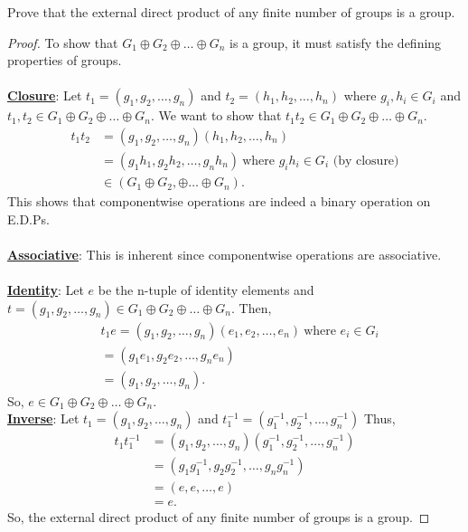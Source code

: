 \documentclass[12pt, letterpaper]{article}
\begin{document}
 Prove that the external direct product of any finite number of groups is a group.
\begin{proof}
    To show that $G_1 \oplus G_2 \oplus \ldots \oplus G_n$ is a group, it must satisfy the defining properties of groups. \\ \\
    \underline{\textbf{Closure}}: Let $t_{1} = (g_{1}, g_{2}, \ldots, g_n)$ and $t_{2} = (h_{1}, h_{2}, \ldots, h_{n})$ where $g_{i}, h_{i} \in G_{i}$ and $t_{1}, t_{2} \in G_1 \oplus G_2 \oplus \ldots \oplus G_n$. We want to show that $t_{1}t_{2} \in G_1 \oplus G_2 \oplus \ldots \oplus G_n$.
    \begin{align*}
        t_{1}t_{2} &=  (g_{1}, g_{2}, \ldots, g_n)(h_{1}, h_{2}, \ldots, h_{n}) \\
        &= (g_{1}h_{1}, g_{2}h_{2}, \ldots, g_{n}h_{n}) \ \text{where $g_ih_i \in G_i$ (by closure)} \\
        &\in (G_{1} \oplus G_{2}, \oplus \ldots \oplus G_{n}).
    \end{align*}
    This shows that componentwise operations are indeed a binary operation on E.D.Ps. \\ \\
    \underline{\textbf{Associative}}: This is inherent since componentwise operations are associative.  \\ \\
    \underline{\textbf{Identity}}: Let $e$ be the n-tuple of identity elements and $t = (g_{1}, g_{2}, \ldots, g_n) \in G_{1} \oplus G_{2} \oplus \ldots \oplus G_{n}$. Then,
    \begin{align*}
        &t_1e=(g_{1}, g_{2}, \ldots, g_n)(e_1, e_2, \ldots, e_n) \ \text{where $e_{i} \in G_{i}$}\\
        &= (g_1e_1,g_2e_2, \ldots, g_ne_n) \\
        &=(g_{1}, g_{2}, \ldots, g_n). 
    \end{align*}
    So, $e \in G_{1} \oplus G_{2} \oplus \ldots \oplus G_n$. \\ 
    \underline{\textbf{Inverse}}: Let $t_{1} = (g_{1}, g_{2}, \ldots, g_n)$ and $t^{-1}_1 = (g_{1}^{-1}, g_{2}^{-1}, \ldots, g_n^{-1})$ Thus, 
    \begin{align*}
        t_{1}t_{1}^{-1}&=(g_{1}, g_{2}, \ldots, g_n)(g_{1}^{-1}, g_{2}^{-1}, \ldots, g_{n}^{-1}) \\
        &= (g_{1}g_{1}^{-1}, g_{2}g_{2}^{-1}, \ldots, g_{n}g_{n}^{-1}) \\
        &= (e, e, \ldots, e) \\
        &= e.
    \end{align*}
 So, the external direct product of any finite number of groups is a group.
\end{proof} 
\end{document}
